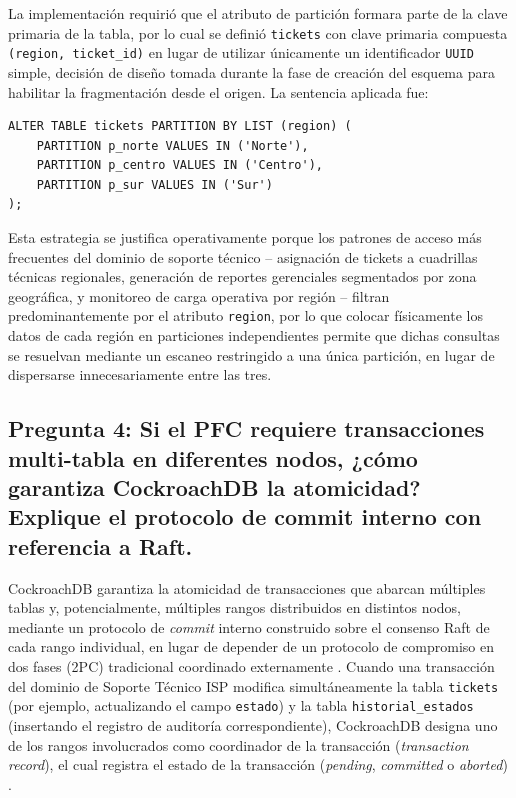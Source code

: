 \documentclass[12pt, a4paper]{article}
\begin{document}
La implementación requirió que el atributo de partición formara parte de la clave primaria de la tabla, por lo cual se definió \texttt{tickets} con clave primaria compuesta \texttt{(region, ticket\_id)} en lugar de utilizar únicamente un identificador \texttt{UUID} simple, decisión de diseño tomada durante la fase de creación del esquema para habilitar la fragmentación desde el origen. La sentencia aplicada fue:
\begin{lstlisting}[style=sqlstyle]
ALTER TABLE tickets PARTITION BY LIST (region) (
    PARTITION p_norte VALUES IN ('Norte'),
    PARTITION p_centro VALUES IN ('Centro'),
    PARTITION p_sur VALUES IN ('Sur')
);
\end{lstlisting}
Esta estrategia se justifica operativamente porque los patrones de acceso más frecuentes del dominio de soporte técnico -- asignación de tickets a cuadrillas técnicas regionales, generación de reportes gerenciales segmentados por zona geográfica, y monitoreo de carga operativa por región -- filtran predominantemente por el atributo \texttt{region}, por lo que colocar físicamente los datos de cada región en particiones independientes permite que dichas consultas se resuelvan mediante un escaneo restringido a una única partición, en lugar de dispersarse innecesariamente entre las tres.

\subsection*{Pregunta 4: Si el PFC requiere transacciones multi-tabla en diferentes nodos, ¿cómo garantiza CockroachDB la atomicidad? Explique el protocolo de commit interno con referencia a Raft.}

CockroachDB garantiza la atomicidad de transacciones que abarcan múltiples tablas y, potencialmente, múltiples rangos distribuidos en distintos nodos, mediante un protocolo de \textit{commit} interno construido sobre el consenso Raft de cada rango individual, en lugar de depender de un protocolo de compromiso en dos fases (2PC) tradicional coordinado externamente \cite{taft2020cockroachdb}. Cuando una transacción del dominio de Soporte Técnico ISP modifica simultáneamente la tabla \texttt{tickets} (por ejemplo, actualizando el campo \texttt{estado}) y la tabla \texttt{historial\_estados} (insertando el registro de auditoría correspondiente), CockroachDB designa uno de los rangos involucrados como coordinador de la transacción (\textit{transaction record}), el cual registra el estado de la transacción (\textit{pending}, \textit{committed} o \textit{aborted}) \cite{taft2020cockroachdb}.
\end{document}
